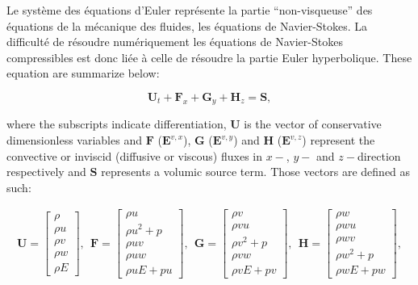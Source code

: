 Le système des équations d’Euler représente la partie “non-visqueuse” des équations de
la mécanique des fluides, les équations de Navier-Stokes. La difficulté de résoudre numériquement les équations de Navier-Stokes compressibles est donc liée à celle de résoudre la partie Euler hyperbolique. These equation are summarize below:

\begin{equation}
    \mathbf{U}_t + \mathbf{F}_x + \mathbf{G}_y + \mathbf{H}_z = \mathbf{S},
    \label{eq:cons_ns}
\end{equation}

where the subscripts indicate differentiation, $\mathbf{U}$ is the vector of conservative dimensionless variables and $\mathbf{F}$ ($\mathbf{E}^{v,x}$), $\mathbf{G}$ ($\mathbf{E}^{v,y}$) and $\mathbf{H}$ ($\mathbf{E}^{v,z}$) represent the convective or inviscid (diffusive or viscous) fluxes in $x-$, $y-$ and $z-$direction respectively and $\mathbf{S}$ represents a volumic source term.
Those vectors are defined as such:

\begin{equation}
    \begin{array}{l}
        \mathbf{U} = \left[\begin{array}{c}\rho \\ \rho u \\ \rho v \\ \rho w \\ \rho E\end{array}\right], ~~
        \mathbf{F} = \left[\begin{array}{c}\rho u \\ \rho u^2 + p \\ \rho u v \\ \rho u w \\ \rho u E + p u\end{array}\right], ~~
        \mathbf{G} = \left[\begin{array}{c}\rho v \\ \rho v u \\ \rho v^2 + p \\ \rho v w \\ \rho v E + p v\end{array}\right], ~~
        \mathbf{H} = \left[\begin{array}{c}\rho w \\ \rho w u \\ \rho w v \\ \rho w^2 + p \\ \rho w E + p w\end{array}\right], \\[4em]
    \end{array}
    \label{eq:cons_ns_vectors}
\end{equation}
